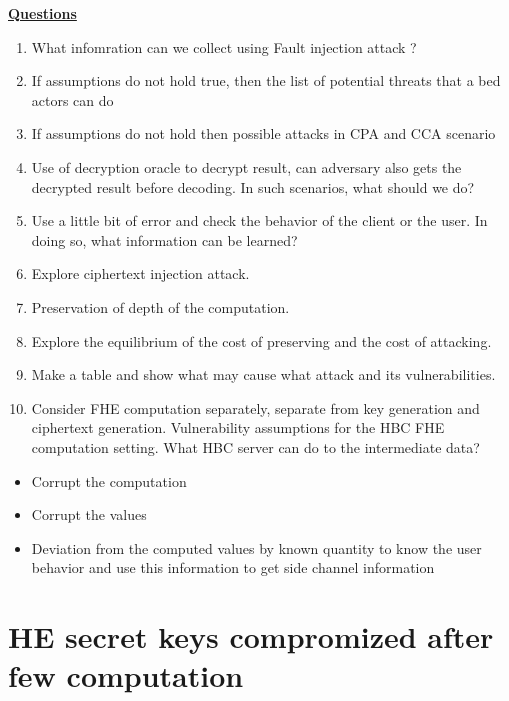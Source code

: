\newpage
\begin{center}
    \underline{\textbf{Questions}}
\end{center}
\begin{enumerate}
    \item What infomration can we collect using Fault injection attack ?
    \item If assumptions do not hold true, then the list of potential threats that a bed actors can do
    \item If assumptions do not hold then possible attacks in CPA and CCA scenario
    \item Use of decryption oracle to decrypt result, can adversary also gets the decrypted result before decoding. In such scenarios, what should we do?
    \item Use a little bit of error and check the behavior of the client or the user. In doing so, what information can be learned?
    \item Explore ciphertext injection attack.
    \item Preservation of depth of the computation.
    \item Explore the equilibrium of the cost of preserving and the cost of attacking.
    \item Make a table and show what may cause what attack and its vulnerabilities.
    \item Consider FHE computation separately, separate from key generation and ciphertext generation. Vulnerability assumptions for the HBC FHE computation setting. What HBC server can do to the intermediate data?
\end{enumerate}

\begin{itemize}
    \item Corrupt the computation
    \item Corrupt the values
    \item Deviation from the computed values by known quantity to know the user behavior and use this information to get side channel information
\end{itemize}





\newpage
\section{HE secret keys compromized after few computation}


